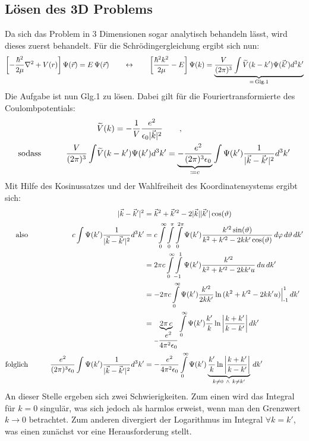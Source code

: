 \subsection{Lösen des 3D Problems}
Da sich das Problem in 3 Dimensionen sogar analytisch behandeln lässt, wird dieses zuerst behandelt. Für die Schrödingergleichung ergibt sich nun: 
\begin{align*}
\left [-\frac{\hbar^2}{2\mu}\nabla ^2 + V(r)\right ]\Psi(\vec{r}) &= E\, \Psi(\vec{r}) \qquad \leftrightarrow \qquad\left [\frac{\hbar^2k^2}{2\mu}-E  \right ]\Psi(k) =\underbrace{ \frac{V}{(2\pi)^3} \int  \widetilde{V}(k-k')\Psi(\vec{k} ') d^3 k'}_{= \, \text{Glg.1}} \\
\end{align*}
Die Aufgabe ist nun Glg.1 zu lösen. Dabei gilt für die Fouriertransformierte des Coulombpotentials: 
\begin{alignat*}{2}
									&& &\widetilde V(k) = -\frac{1}{V}\frac{e^2}{\epsilon_0 |\vec{k} |^2} \qquad , \\
\text{sodass}\qquad 	&& \frac{V}{(2\pi)^3} \int  &\widetilde{V}(k-k')\Psi(k ') d^3 k' = \underbrace{-\frac{e^2}{(2\pi)^3 \epsilon_0}}_{\coloneqq c} \int  \Psi(k ')\frac{1}{|\vec{k} - \vec{k} '|^2} d^3 k'
\end{alignat*}
Mit Hilfe des Kosinussatzes und der Wahlfreiheit des Koordinatensystems ergibt sich: 
\begin{alignat*}{2}
									&& |\vec{k} - \vec{k} ' |^2 &= \vec{k} ^2 + \vec{k} '^2 -2|\vec{k} ||\vec{k} '|\cos(\vartheta) 	 \\
\text{also}\qquad 		&& c \int  \Psi(k ')\frac{1}{|\vec{k} - \vec{k} '|^2} d^3 k' 	&= c\int\limits_{0}^{\infty}\int\limits_{0}^{\pi}\int\limits_{0}^{2\pi} \Psi(k ')\frac{k '^2 \sin(\vartheta)}{k ^2 + k '^2 -2kk '\cos(\vartheta)} \,d\varphi \, d\vartheta \, dk' \\
									&& &= 2\pi c\int\limits_{0}^{\infty}\int\limits_{-1}^{1} \Psi(k ')\frac{k '^2}{k ^2 + k '^2 -2kk 'u} \,du \, dk' \\
									&& &= -2\pi c\int\limits_{0}^{\infty} \Psi(k ')\frac{k '^2}{2kk '}\ln{(k ^2 + k '^2 -2kk 'u)}\Big |_{\text{-}1}^1 \,dk' \\
									&& &= \underbrace{2\pi \,c}_{-\dfrac{e^2}{4\pi^2 \epsilon_0}} \int\limits_{0}^{\infty} \Psi(k ')\frac{k '}{k}\ln{\left |\frac{k + k '}{k-k'}\right |} \, dk' \\
\text{folglich}\qquad 	&&  \frac{e^2}{(2\pi)^3 \epsilon_0} \int  \Psi(k ')\frac{1}{|\vec{k} - \vec{k} '|^2} d^3 k' &= -\dfrac{e^2}{4\pi^2 \epsilon_0} \int\limits_{0}^{\infty} \Psi(k ')\underbrace{\frac{k '}{k}\ln{\left |\frac{k + k '}{k-k'}\right |}}_{k\neq0\  \wedge \  k\neq k'} \, dk' 
\end{alignat*}
An dieser Stelle ergeben sich zwei Schwierigkeiten. Zum einen wird das Integral für $k = 0$ singulär, was sich jedoch als harmlos erweist, wenn man den Grenzwert $k \rightarrow 0$ betrachtet. Zum anderen divergiert der Logarithmus im Integral $\forall k=k'$, was einen zunächst vor eine Herausforderung stellt. \\ \\

